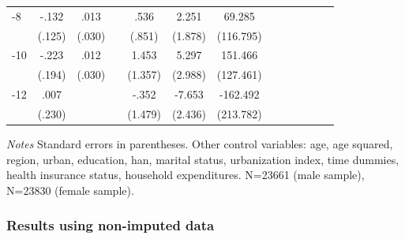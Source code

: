 \begin{table}[h]
\begin{adjustbox}{max width=\linewidth}
\begin{threeparttable}
{\begin{tabular}{l*{6}{S
S}}
-8             &    -.132         &     .013         &                  &     .536         &    2.251         &   69.285         \\
                &   (.125)         &   (.030)         &                  &   (.851)         &  (1.878)         &(116.795)         \\
-10            &    -.223         &     .012         &                  &    1.453         &    5.297\sym{*}  &  151.466         \\
                &   (.194)         &   (.030)         &                  &  (1.357)         &  (2.988)         &(127.461)         \\
-12           &     .007         &                  &                  &    -.352         &   -7.653\sym{***}& -162.492         \\
                &   (.230)         &                  &                  &  (1.479)         &  (2.436)         &(213.782)         \\        
\bottomrule
\end{tabular}
\begin{tablenotes}
\item \textit{Notes}   Standard errors in parentheses.
Other control variables: age, age squared, region, urban, education, han, marital status, urbanization index, time dummies, health insurance status, household expenditures.  N=23661 (male sample), N=23830 (female sample).
\end{tablenotes}
}
\end{threeparttable}
\end{adjustbox}
\end{table}
\FloatBarrier


\subsubsection*{Results using non-imputed data}

